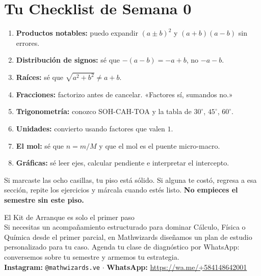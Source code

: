 \documentclass[12pt, letterpaper]{article}
\makeatletter
\newcommand{\mwcta}[2]{%
  \begin{center}
    \begin{minipage}{0.94\linewidth}
      \begin{cuadroextra}
        \centering
        {\nxheav\Large\color{mwprimario}#1}\\[8pt]
        {\small #2}\\[12pt]
        {\footnotesize\color{mwgris}
          \textbf{Instagram:} \texttt{@mathwizards.ve} \quad$\cdot$\quad
          \textbf{WhatsApp:} \url{https://wa.me/+584148642001}}
      \end{cuadroextra}
    \end{minipage}
  \end{center}
}
\makeatother
\begin{document}
\section{Tu Checklist de Semana 0}

\begin{cuadroinfo}
  \small
  \begin{enumerate}[leftmargin=*]
    \item[$\square$] \textbf{Productos notables:} puedo expandir $(a \pm b)^2$ y $(a+b)(a-b)$ sin errores.
    \item[$\square$] \textbf{Distribución de signos:} sé que $-(a - b) = -a + b$, no $-a - b$.
    \item[$\square$] \textbf{Raíces:} sé que $\sqrt{a^2 + b^2} \neq a + b$.
    \item[$\square$] \textbf{Fracciones:} factorizo antes de cancelar. «Factores sí, sumandos no.»
    \item[$\square$] \textbf{Trigonometría:} conozco SOH-CAH-TOA y la tabla de $30^\circ$, $45^\circ$, $60^\circ$.
    \item[$\square$] \textbf{Unidades:} convierto usando factores que valen $1$.
    \item[$\square$] \textbf{El mol:} sé que $n = m/M$ y que el mol es el puente micro-macro.
    \item[$\square$] \textbf{Gráficas:} sé leer ejes, calcular pendiente e interpretar el intercepto.
  \end{enumerate}
\end{cuadroinfo}

\noindent Si marcaste las ocho casillas, tu piso está sólido. Si alguna te costó, regresa a esa sección, repite los ejercicios y márcala cuando estés listo. \textbf{No empieces el semestre sin este piso.}

\newpage
\vspace*{\fill}

\mwcta{El Kit de Arranque es solo el primer paso}{Si necesitas un acompañamiento estructurado para dominar Cálculo, Física o Química desde el primer parcial, en Mathwizards diseñamos un plan de estudio personalizado para tu caso. Agenda tu clase de diagnóstico por WhatsApp: conversemos sobre tu semestre y armemos tu estrategia.}

\vspace*{\fill}
\end{document}
